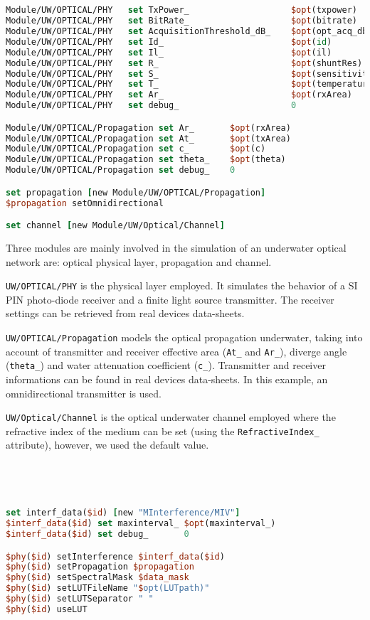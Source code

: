 \documentclass[11pt]{article}
\begin{document}
\ 
{\scriptsize\tt
\begin{lstlisting}[language=tcl]
Module/UW/OPTICAL/PHY   set TxPower_                    $opt(txpower)
Module/UW/OPTICAL/PHY   set BitRate_                    $opt(bitrate)
Module/UW/OPTICAL/PHY   set AcquisitionThreshold_dB_    $opt(opt_acq_db)
Module/UW/OPTICAL/PHY   set Id_                         $opt(id)
Module/UW/OPTICAL/PHY   set Il_                         $opt(il)
Module/UW/OPTICAL/PHY   set R_                          $opt(shuntRes)
Module/UW/OPTICAL/PHY   set S_                          $opt(sensitivity)
Module/UW/OPTICAL/PHY   set T_                          $opt(temperatura)
Module/UW/OPTICAL/PHY   set Ar_                         $opt(rxArea)
Module/UW/OPTICAL/PHY   set debug_                      0

Module/UW/OPTICAL/Propagation set Ar_       $opt(rxArea)
Module/UW/OPTICAL/Propagation set At_       $opt(txArea)
Module/UW/OPTICAL/Propagation set c_        $opt(c)
Module/UW/OPTICAL/Propagation set theta_    $opt(theta)
Module/UW/OPTICAL/Propagation set debug_    0

set propagation [new Module/UW/OPTICAL/Propagation]
$propagation setOmnidirectional

set channel [new Module/UW/Optical/Channel]
\end{lstlisting}
}

Three modules are mainly involved in the simulation of an underwater optical network are: optical physical layer, propagation and channel. 

{\tt UW/OPTICAL/PHY} is the physical layer employed. It simulates the behavior of a SI PIN photo-diode receiver and a finite light source transmitter. The receiver settings can be retrieved from real devices data-sheets.

{\tt UW/OPTICAL/Propagation} models the optical propagation underwater, taking into account of transmitter and receiver effective area ({\tt At\_} and {\tt Ar\_}), diverge angle ({\tt theta\_}) and water attenuation coefficient ({\tt c\_}). Transmitter and receiver informations can be found in real devices data-sheets. In this example, an omnidirectional transmitter is used. 

{\tt UW/Optical/Channel} is the optical underwater channel employed where the refractive index of the medium can be set (using the {\tt RefractiveIndex\_} attribute), however, we used the default value.

\ 
{\scriptsize\tt
\begin{lstlisting}[language=tcl]
set interf_data($id) [new "MInterference/MIV"]
$interf_data($id) set maxinterval_ $opt(maxinterval_)
$interf_data($id) set debug_       0

$phy($id) setInterference $interf_data($id)
$phy($id) setPropagation $propagation
$phy($id) setSpectralMask $data_mask
$phy($id) setLUTFileName "$opt(LUTpath)"
$phy($id) setLUTSeparator " "
$phy($id) useLUT 
 
\end{lstlisting}
}
\end{document}
